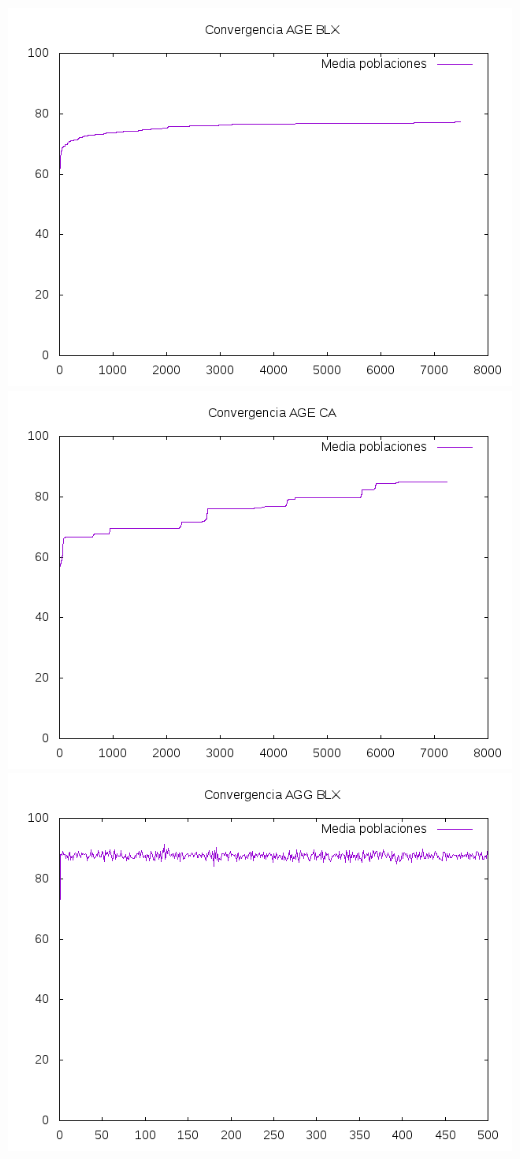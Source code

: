 \documentclass[12pt,a4paper]{article}
\begin{document}
	
	\includegraphics[scale=0.5]{../Graficas/Imagenes/Convergencia/convergencia_estacionario_blx.png}
	\includegraphics[scale=0.5]{../Graficas/Imagenes/Convergencia/convergencia_estacionario_aritmetico.png}
	\includegraphics[scale=0.5]{../Graficas/Imagenes/Convergencia/convergencia_generacional_blx.png}
\end{document}
